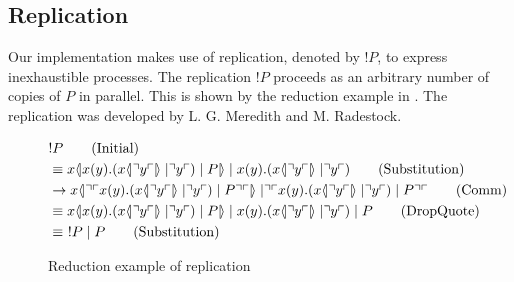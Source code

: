 \subsection{Replication}
Our implementation makes use of replication, denoted by $!P$, to express inexhaustible processes.
The replication $!P$ proceeds as an arbitrary number of copies of $P$ in parallel. This is shown by the reduction example in . The replication was developed by L. G. Meredith and M. Radestock\citep{Meredith2005}.






\begin{figure}[h]
    \begin{align}
        &!P \tag{Initial} \\
        &\equiv \lift{x}{\inp{x}{y}(\lift{x}{\drop{y}}\para\drop{y})\para P}\para\inp{x}{y}(\lift{x}{\drop{y}}\para \drop{y}) \tag{Substitution} \\
        &\ra \lift{x}{\drop{\quot{\inp{x}{y}(\lift{x}{\drop{y}}\para\drop{y})\para P}}}\para\drop{\quot{\inp{x}{y}(\lift{x}{\drop{y}}\para\drop{y})\para P}} \tag{Comm}\\
        &\equiv \lift{x}{\inp{x}{y}(\lift{x}{\drop{y}}\para\drop{y})\para P}\para\inp{x}{y}(\lift{x}{\drop{y}}\para \drop{y})\para P \tag{DropQuote} \\
        &\equiv\ 
        !P\para P \tag{Substitution}
    \end{align}
    \caption{Reduction example of replication}
    \label{fig:reductionexample}
\end{figure}

\FloatBarrier